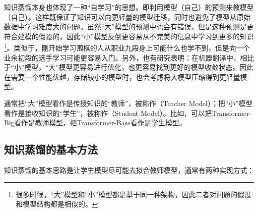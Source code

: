 \parinterval 知识蒸馏本身也体现了一种“自学习”的思想。即利用模型（自己）的预测来教模型（自己）。这样既保证了知识可以向更轻量的模型迁移，同时也避免了模型从原始数据中学习难度大的问题。虽然“大”模型的预测中也会有错误，但是这种预测是更符合建模的假设的，因此“小”模型反倒更容易从不完美的信息中学习到更多的知识\footnote[15]{很多时候，“大”模型和“小”模型都是基于同一种架构，因此二者对问题的假设和模型结构都是相似的。}。类似于，刚开始学习围棋的人从职业九段身上可能什么也学不到，但是向一个业余初段的选手学习可能更容易入门。另外，也有研究表明：在机器翻译中，相比于“小”模型，“大”模型更容易进行优化，也更容易找到更好的模型收敛状态。因此在需要一个性能优越，存储较小的模型时，也会考虑将大模型压缩得到更轻量模型。

\parinterval 通常把“大”模型看作是传授知识的“教师”，被称作{\small{}}（Teacher Model）；把“小”模型看作是接收知识的“学生”，被称作{\small{}}（Student Model）。比如，可以把Transformer-Big看作是教师模型，把Transformer-Base看作是学生模型。


\subsection{知识蒸馏的基本方法}

\parinterval 知识蒸馏的基本思路是让学生模型尽可能去拟合教师模型，通常有两种实现方式：

